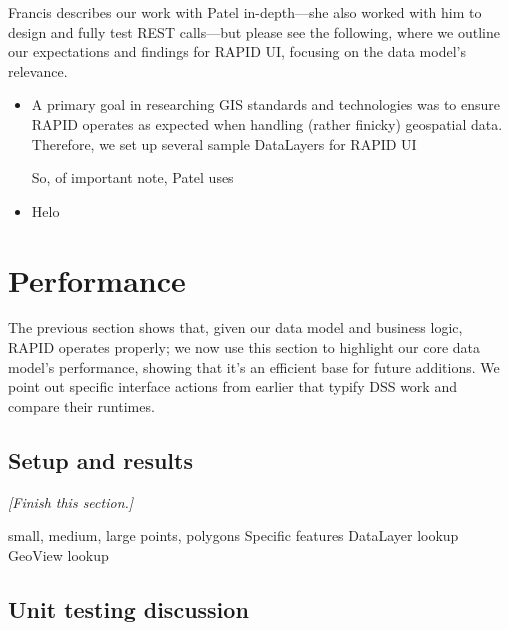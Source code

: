 Francis describes our work with Patel in-depth---she also worked with him to design and fully test REST calls---but please see the following, where we outline our expectations and findings for RAPID UI, focusing on the data model's relevance.

\begin{itemize}
\item A primary goal in researching GIS standards and technologies was to ensure RAPID operates as expected when handling (rather finicky) geospatial data. Therefore, we set up several sample DataLayers for RAPID UI

So, of important note, Patel uses

\item Helo
\end{itemize}

\section{Performance}
The previous section shows that, given our data model and business logic, RAPID operates properly; we now use this section to highlight our core data model's performance, showing that it's an efficient base for future additions. We point out specific interface actions from earlier that typify DSS work and compare their runtimes.

\subsection{Setup and results}
\textit{[Finish this section.]}

small, medium, large
points, polygons
Specific features
DataLayer lookup
GeoView lookup


\subsection{Unit testing discussion}


